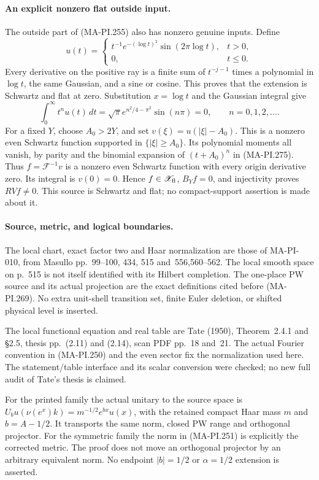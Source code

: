 \paragraph{An explicit nonzero flat outside input.}
The outside part of (MA-PI.255) also has nonzero genuine
inputs.  Define
\[
 u(t)=
 \begin{cases}
 t^{-1}e^{-(\log t)^2}\sin(2\pi\log t),&t>0,\\
 0,&t\le0.
 \end{cases}
 \tag{MA-PI.274}
\]
Every derivative on the positive ray is a finite sum of
\(t^{-j-1}\) times a polynomial in \(\log t\), the same
Gaussian, and a sine or cosine.  This proves that the
extension is Schwartz and flat at zero.  Substitution
\(x=\log t\) and the Gaussian integral give
\[
 \int_0^\infty t^n u(t)\,dt
   =\sqrt\pi e^{n^2/4-\pi^2}\sin(n\pi)=0,
                              \qquad n=0,1,2,\ldots.
 \tag{MA-PI.275}
\]
For a fixed \(Y\), choose \(A_0>2Y\), and set
\(v(\xi)=u(|\xi|-A_0)\).  This is a nonzero even
Schwartz function supported in \(\{|\xi|\ge A_0\}\).
Its polynomial moments all vanish, by parity and the
binomial expansion of \((t+A_0)^n\) in (MA-PI.275).
Thus \(f=\mathcal F^{-1}v\) is a nonzero even Schwartz
function with every origin derivative zero.  Its integral
is \(v(0)=0\).  Hence \(f\in\mathscr X_{\rm fl}\),
\(B_Yf=0\), and injectivity proves \(RVf\ne0\).
This source is Schwartz and flat; no compact-support
assertion is made about it.

\paragraph{Source, metric, and logical boundaries.}
The local chart, exact factor two and Haar normalization
are those of MA-PI-010, from Masullo pp.~99--100, 434,
515 and~556,560--562.  The local smooth space on p.~515
is not itself identified with its Hilbert completion.
The one-place PW source and its actual projection are
the exact definitions cited before (MA-PI.269).
No extra unit-shell transition set, finite Euler deletion,
or shifted physical level is inserted.

The local functional equation and real table are Tate
(1950), Theorem~2.4.1 and \S2.5, thesis pp.~(2.11) and
(2.14), scan PDF pp.~18 and~21.  The actual Fourier
convention in (MA-PI.250) and the even sector fix the
normalization used here.  The statement/table interface
and its scalar conversion were checked; no new full
audit of Tate's thesis is claimed.

For the printed family the actual unitary to the source
space is \(U_bu(\nu(e^x)k)=m^{-1/2}e^{bx}u(x)\), with
the retained compact Haar mass \(m\) and \(b=A-1/2\).
It transports the same norm, closed PW range and
orthogonal projector.  For the symmetric family the
norm in (MA-PI.251) is explicitly the corrected metric.
The proof does not move an orthogonal projector by an
arbitrary equivalent norm.  No endpoint \(|b|=1/2\)
or \(\alpha=1/2\) extension is asserted.

